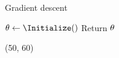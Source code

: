 \begin{frame}[label=MLP_learning_2]
\begin{textblock}{45}
{\begin{block}{Gradient descent}
\begin{algorithm}[H]
          $\params \leftarrow \Initialize()$\;
          Return $\mathbf{\theta}$\;
        \end{algorithm}
      \end{block}
    }
  \end{textblock}

  \begin{textblock}{45}(50, 60)
  \end{textblock}
\end{frame}


